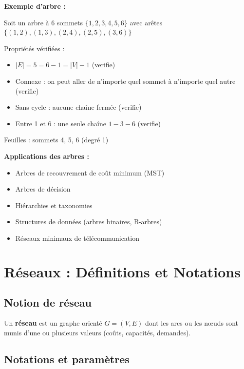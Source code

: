 \documentclass[12pt,a4paper]{article}
\begin{document}
\begin{exemple}
\textbf{Exemple d'arbre :}

Soit un arbre à 6 sommets $\{1, 2, 3, 4, 5, 6\}$ avec arêtes $\{(1,2), (1,3), (2,4), (2,5), (3,6)\}$

Propriétés vérifiées :
\begin{itemize}
    \item $|E| = 5 = 6 - 1 = |V| - 1$ (verifie)
    \item Connexe : on peut aller de n'importe quel sommet à n'importe quel autre (verifie)
    \item Sans cycle : aucune chaîne fermée (verifie)
    \item Entre 1 et 6 : une seule chaîne $1 - 3 - 6$ (verifie)
\end{itemize}

Feuilles : sommets 4, 5, 6 (degré 1)
\end{exemple}

\begin{astuce}
\textbf{Applications des arbres :}
\begin{itemize}
    \item Arbres de recouvrement de coût minimum (MST)
    \item Arbres de décision
    \item Hiérarchies et taxonomies
    \item Structures de données (arbres binaires, B-arbres)
    \item Réseaux minimaux de télécommunication
\end{itemize}
\end{astuce}

\newpage
\section{Réseaux : Définitions et Notations}

\subsection{Notion de réseau}

\begin{definition}
Un \textcolor{titrebleu}{\textbf{réseau}} est un graphe orienté $G = (V, E)$ dont les arcs ou les nœuds sont munis d'une ou plusieurs valeurs (coûts, capacités, demandes).
\end{definition}

\subsection{Notations et paramètres}
\end{document}
